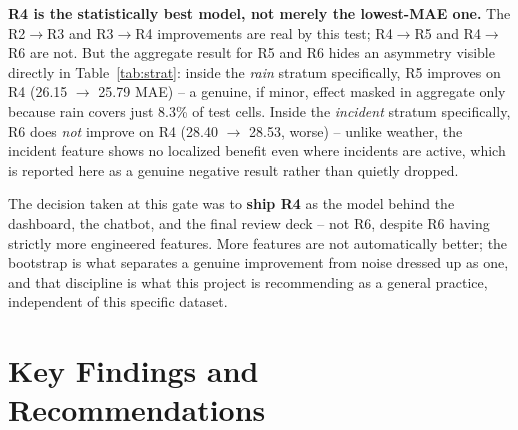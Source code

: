 \documentclass[11pt]{article}
\begin{document}
\begin{finding}
\textbf{R4 is the statistically best model, not merely the lowest-MAE one.} The R2$\to$R3 and
R3$\to$R4 improvements are real by this test; R4$\to$R5 and R4$\to$R6 are not. But the aggregate
result for R5 and R6 hides an asymmetry visible directly in Table~\ref{tab:strat}: inside the
\emph{rain} stratum specifically, R5 improves on R4 (26.15 $\to$ 25.79 MAE) -- a genuine, if
minor, effect masked in aggregate only because rain covers just 8.3\% of test cells. Inside the
\emph{incident} stratum specifically, R6 does \emph{not} improve on R4 (28.40 $\to$ 28.53, worse)
-- unlike weather, the incident feature shows no localized benefit even where incidents are
active, which is reported here as a genuine negative result rather than quietly dropped.
\end{finding}

\begin{sowhat}
The decision taken at this gate was to \textbf{ship R4} as the model behind the dashboard, the
chatbot, and the final review deck -- not R6, despite R6 having strictly more engineered
features. More features are not automatically better; the bootstrap is what separates a genuine
improvement from noise dressed up as one, and that discipline is what this project is
recommending as a general practice, independent of this specific dataset.
\end{sowhat}

\section{Key Findings and Recommendations}
\end{document}
